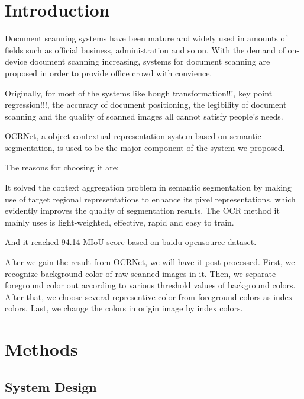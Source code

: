 \documentclass[10pt, conference, compsocconf]{IEEEtran}
\begin{document}
	\section{Introduction}
	

	Document scanning systems have been mature and widely used in amounts of fields such as official business, administration and so on. 
	With the demand of on-device document scanning increasing, systems for document scanning are proposed in order to provide office crowd with convience. 


	Originally, for most of the systems like hough transformation!!!, key point regression!!!, the accuracy of document positioning, the legibility of document scanning and the quality of scanned images all cannot satisfy people's needs. 


	OCRNet, a object-contextual representation system based on semantic segmentation, is used to be the major component of the system we proposed. 


	The reasons for choosing it are: 
	
	It solved the context aggregation problem in semantic segmentation by making use of target regional representations to enhance its pixel representations, which evidently improves the quality of segmentation results. 
	The OCR method it mainly uses is light-weighted, effective, rapid and easy to train.  


	And it reached 94.14 MIoU score based on baidu opensource dataset. 


	After we gain the result from OCRNet, we will have it post processed. 
	First, we recognize background color of raw scanned images in it. 
	Then, we separate foreground color out according to various threshold values of background colors. 
	After that, we choose several representive color from foreground colors as index colors. 
	Last, we change the colors in origin image by index colors. 
	
	\section{Methods}
		\subsection{System Design}
\end{document}
